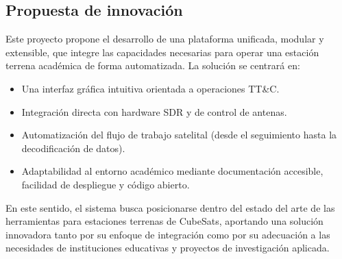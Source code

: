 \subsection*{Propuesta de innovación}

Este proyecto propone el desarrollo de una plataforma unificada, modular y extensible, que integre las capacidades necesarias para operar una estación terrena académica de forma automatizada. La solución se centrará en:

\begin{itemize}
    \item Una interfaz gráfica intuitiva orientada a operaciones TT\&C.
    \item Integración directa con hardware SDR y de control de antenas.
    \item Automatización del flujo de trabajo satelital (desde el seguimiento hasta la decodificación de datos).
    \item Adaptabilidad al entorno académico mediante documentación accesible, facilidad de despliegue y código abierto.
\end{itemize}

En este sentido, el sistema busca posicionarse dentro del estado del arte de las herramientas para estaciones terrenas de CubeSats, aportando una solución innovadora tanto por su enfoque de integración como por su adecuación a las necesidades de instituciones educativas y proyectos de investigación aplicada.

